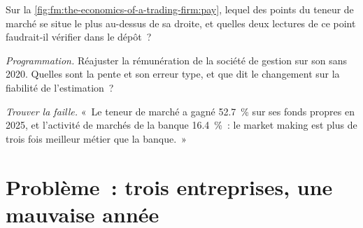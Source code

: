 \begin{exercise}[$\star\star$]\label{exo:fm:the-economics-of-a-trading-firm:6}
Sur la \cref{fig:fm:the-economics-of-a-trading-firm:pay}, lequel des points du teneur de marché se situe le plus au-dessus de sa droite, et quelles deux lectures de ce point
faudrait-il vérifier dans le dépôt~?
\end{exercise}

\begin{exercise}[$\star\star\star$]\label{exo:fm:the-economics-of-a-trading-firm:7}
\emph{Programmation.} Réajuster la rémunération de la société de gestion sur son  sans 2020. Quelles sont la pente et son erreur type, et que dit le
changement sur la fiabilité de l'estimation~?
\end{exercise}

\begin{exercise}[$\star\star\star$]\label{exo:fm:the-economics-of-a-trading-firm:8}
\emph{Trouver la faille.} «~Le teneur de marché a gagné 52.7~\% sur ses fonds propres en 2025, et l'activité de marchés de la banque 16.4~\%~: le market making est plus de
trois fois meilleur métier que la banque.~»
\end{exercise}

\section{Problème~: trois entreprises, une mauvaise année}

